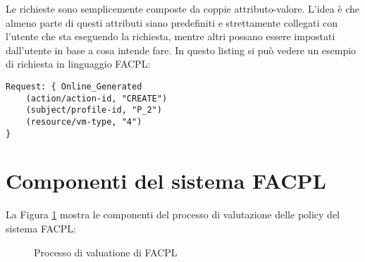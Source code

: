 Le richieste sono semplicemente composte da coppie attributo-valore. L'idea è che almeno parte di questi attributi siano predefiniti e strettamente collegati con l'utente che sta eseguendo la richiesta, mentre altri possano essere impostati dall'utente in base a cosa intende fare. In questo listing si può vedere un esempio di richiesta in linguaggio FACPL:
\begin{lstlisting}[xleftmargin=1em, label={code:requestFacpl}, caption={Esempio di richiesta in FACPL}, language=FACPL, basicstyle=\fontsize{9.5}{10}\ttfamily]
Request: { Online_Generated
    (action/action-id, "CREATE")
    (subject/profile-id, "P_2")
    (resource/vm-type, "4")
}
\end{lstlisting} 
\section{Componenti del sistema FACPL}
\label{sec:componentiFACPL}
La Figura \ref{fig:facplEvaluationProcess} mostra le componenti del processo di valutazione delle policy del sistema FACPL:
\begin{figure}[h]
    \centering
    
    \caption{Processo di valuatione di FACPL}
    \label{fig:facplEvaluationProcess}
\end{figure}
